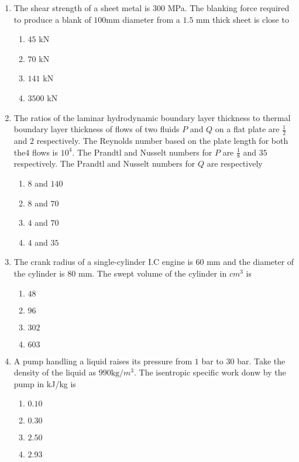 \documentclass[journal,12pt,onecolumn]{IEEEtran}
\theoremstyle{remark}
\begin{document}
\begin{enumerate}
\item The shear strength of a sheet metal is $300$ MPa. The blanking force required to produce a blank of $100$mm diameter from a $1.5$ mm thick sheet is close to
\begin{enumerate}
\item $45$ kN
\item $70$ kN
\item $141$ kN
\item $3500$ kN
\end{enumerate}

\item The ratios of the laminar hydrodynamic boundary layer thickness to thermal boundary layer thickness of flows of two fluids $P$ and $Q$ on a flat plate are $\frac{1}{2}$ and $2$ respectively. The Reynolds number based on the plate length for both the4 flows is $10^4$. The Prandtl and Nusselt numbers for $P$ are $\frac{1}{8}$ and $35$ respectively. The Prandtl and Nusselt numbers for $Q$ are respectively
\begin{enumerate}
\item $8$ and $140$
\item $8$ and $70$
\item $4$ and $70$
\item $4$ and $35$
\end{enumerate}

\item The crank radius of a single-cylinder I.C engine is $60$ mm and the diameter of the cylinder is $80$ mm. The swept volume of the cylinder in ${cm}^3$ is
\begin{enumerate}
\item $48$
\item $96$
\item $302$
\item $603$
\end{enumerate}

\item A pump handling a liquid raises its pressure from $1$ bar to $30$ bar. Take the density of the liquid as $990 \text{kg}/{m}^3$. The isentropic specific work donw by the pump in kJ/kg is
\begin{enumerate}
\item $0.10$
\item $0.30$
\item $2.50$
\item $2.93$
\end{enumerate}



\end{enumerate}
\end{document}

